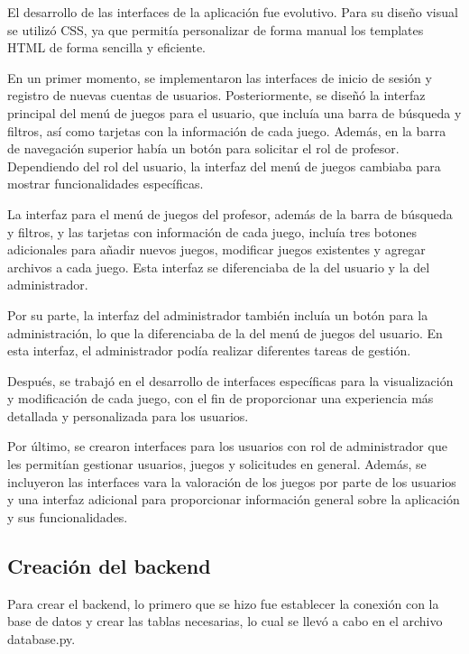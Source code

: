 El desarrollo de las interfaces de la aplicación fue evolutivo. Para su diseño visual se utilizó CSS, ya que permitía personalizar de forma manual los templates HTML de forma sencilla y eficiente.

En un primer momento, se implementaron las interfaces de inicio de sesión y registro de nuevas cuentas de usuarios. Posteriormente, se diseñó la interfaz principal del menú de juegos para el usuario, que incluía una barra de búsqueda y filtros, así como tarjetas con la información de cada juego. Además, en la barra de navegación superior había un botón para solicitar el rol de profesor. Dependiendo del rol del usuario, la interfaz del menú de juegos cambiaba para mostrar funcionalidades específicas.

La interfaz para el menú de juegos del profesor, además de la barra de búsqueda y filtros, y las tarjetas con información de cada juego, incluía tres botones adicionales para añadir nuevos juegos, modificar juegos existentes y agregar archivos a cada juego. Esta interfaz se diferenciaba de la del usuario y la del administrador.

Por su parte, la interfaz del administrador también incluía un botón para la administración, lo que la diferenciaba de la del menú de juegos del usuario. En esta interfaz, el administrador podía realizar diferentes tareas de gestión.

Después, se trabajó en el desarrollo de interfaces específicas para la visualización y modificación de cada juego, con el fin de proporcionar una experiencia más detallada y personalizada para los usuarios.

Por último, se crearon interfaces para los usuarios con rol de administrador que les permitían gestionar usuarios, juegos y solicitudes en general. Además, se incluyeron las interfaces vara la valoración de los juegos por parte de los usuarios y una interfaz adicional para proporcionar información general sobre la aplicación y sus funcionalidades.
    
\subsection{Creación del backend}
Para crear el backend, lo primero que se hizo fue establecer la conexión con la base de datos y crear las tablas necesarias, lo cual se llevó a cabo en el archivo database.py. 


